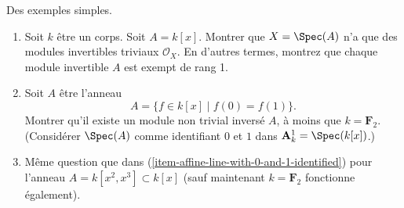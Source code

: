 \begin{exercise}
\label{exercise-simple-examples-invertible}
Des exemples simples.
\begin{enumerate}
\item
\label{item-affine-line}
Soit $k$ être un corps. Soit $A
= k[x]$. Montrer que $X = \Spec(A)$ n'a que des
modules invertibles triviaux ${\mathcal O}_X$. En d'autres termes, montrez que chaque
module invertible $A$ est exempt de rang 1.
\item
\label{item-affine-line-with-0-and-1-identified}
Soit $A$ être l'anneau
$$
A = \{ f\in k[x] \mid f(0) = f(1) \}.
$$
Montrer qu'il existe un module non trivial inversé $A$, à
moins que $k = {\mathbf F}_2$. (Considérer $\Spec(A)$ comme identifiant
$0$ et $1$ dans ${\mathbf A}^1_k = \Spec(k[x])$.)
\item
\label{item-affine-line-with-cusp}
Même question que dans (\ref{item-affine-line-with-0-and-1-identified}) pour l'anneau $A =
k[x^2, x^3] \subset k[x]$ (sauf maintenant
$k = {\mathbf F}_2$ fonctionne également).
\end{enumerate}
\end{exercise}

